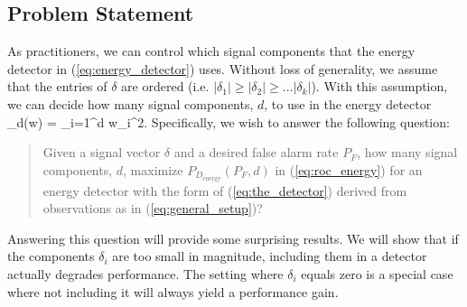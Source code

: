 \subsection{Problem Statement}\label{sec:prob_state}

As practitioners, we can control which signal components that the energy detector in
(\ref{eq:energy_detector}) uses. Without loss of generality, we assume that the entries of
$\delta$ are ordered (i.e. $|\delta_1| \geq |\delta_2| \geq\dots|\delta_k|$). With this
assumption, we can decide how many signal components, $d$, to use in the energy detector
\beq\label{eq:the_detector} 
\Lambda_d(w) = \sum_{i=1}^d w_i^2.
\eeq 
Specifically, we wish to answer the following question:
\begin{quote}
  Given a signal vector $\delta$ and a desired false alarm rate $P_F$, how many signal
  components, $d$, maximize $P_{D_{\text{energy}}}(P_F,d)$ in (\ref{eq:roc_energy}) for an
  energy detector with the form of (\ref{eq:the_detector}) derived from observations
  as in (\ref{eq:general_setup})? 
\end{quote}
Answering this question will provide some surprising results. We will show that if the
components $\delta_i$ are too small in magnitude, including them in a detector actually
degrades performance. The setting where $\delta_i$ equals zero is a special case where not
including it will always yield a performance gain.
